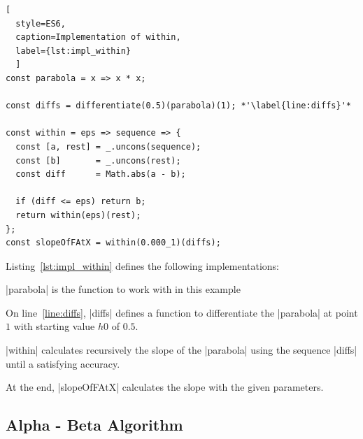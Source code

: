 \begin{lstlisting}[
  style=ES6, 
  caption=Implementation of within,
  label={lst:impl_within}
  ]
const parabola = x => x * x;

const diffs = differentiate(0.5)(parabola)(1); *'\label{line:diffs}'*

const within = eps => sequence => {
  const [a, rest] = _.uncons(sequence);
  const [b]       = _.uncons(rest);
  const diff      = Math.abs(a - b);

  if (diff <= eps) return b;
  return within(eps)(rest);
};
const slopeOfFAtX = within(0.000_1)(diffs);
\end{lstlisting}

Listing~\ref{lst:impl_within} defines the following implementations:

\begin{itemize}
  \item{|parabola| is the function to work with in this example}
  \item{On line~\ref{line:diffs}, |diffs| defines a function to differentiate the |parabola| at point $1$ with
    starting value $h0$ of $0.5$.}
  \item{|within| calculates recursively the slope of the |parabola| using the
      sequence |diffs| until a satisfying accuracy. 
    \item{ At the end, |slopeOfFAtX| calculates the slope with the given parameters. }
    }
\end{itemize}


\subsection{Alpha - Beta Algorithm}
\label{Alpha - Beta Algorithm}

